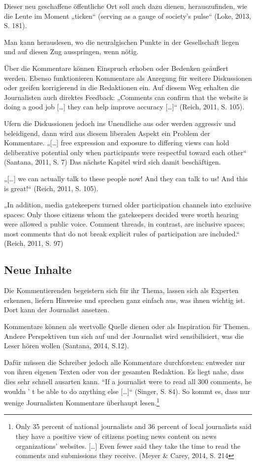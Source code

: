 Dieser neu geschaffene öffentliche Ort soll auch dazu dienen, herauszufinden,
wie die Leute im Moment „ticken“ (serving as a gauge of society’s pulse“ (Loke,
2013, S. 181).

Man kann herauslesen, wo die neuralgischen Punkte in der Gesellschaft liegen und
auf diesen Zug ausspringen, wenn nötig.


Über die Kommentare können Einspruch erhoben oder Bedenken geäußert werden.
Ebenso funktionieren Kommentare als Anregung für weitere Diskussionen oder
greifen korrigierend  in die Redaktionen ein. Auf diesem Weg erhalten die
Journalisten auch direktes Feedback: „Comments can confirm that the website is
doing a good job [\ldots] they can help improve accuracy [\ldots]“ (Reich, 2011,
S. 105).

Ufern die Diskussionen jedoch ins Unendliche aus oder werden aggressiv und
beleidigend, dann wird aus diesem liberalen Aspekt ein Problem der Kommentare.
„[\ldots] free expression and exposure to differing views can hold deliberative
potential only when participants were respectful toward each other“ (Santana,
2011, S. 7) Das nächste Kapitel wird sich damit beschäftigen.

„[\ldots] we can actually talk to these people now! And they can talk to us! And
this is great!“ (Reich, 2011, S. 105).

„In addition, media gatekeepers  turned older participation channels into
exclusive spaces: Only those citizens whom the gatekeepers decided were
worth hearing were allowed a public voice. Comment threads, in contrast,
are inclusive spaces; most comments that do not break explicit rules of
participation are included.“ (Reich, 2011, S. 97)



\subsection{Neue Inhalte}

Die Kommentierenden begeistern sich für ihr Thema, lassen sich als Experten
erkennen, liefern Hinweise und sprechen ganz einfach aus, was ihnen wichtig ist.
Dort kann der Journalist ansetzen.

Kommentare können als wertvolle Quelle dienen oder als Inspiration für Themen.
Andere Perspektiven tun sich auf und der Journalist wird sensibilisiert, was die
Leser hören wollen (Santana, 2014, S.12).

Dafür müssen die Schreiber jedoch alle Kommentare durchforsten: entweder nur von
ihren eigenen Texten oder von der gesamten Redaktion. Es liegt nahe, dass dies
sehr schnell ausarten kann. “If a journalist were to read all 300 comments, he
wouldn ’ t be able to do anything else [\ldots]“ (Singer, S. 84). So kommt es,
dass nur wenige Journalisten Kommentare überhaupt lesen.\footnote{Only 35
percent of national journalists and 36 percent of local journalists said
they have a positive view of citizens posting news content on news
organizations’ websites. [\ldots] Even fewer said they take the time to read the
comments and submissions they receive. (Meyer \& Carey, 2014, S. 214}

